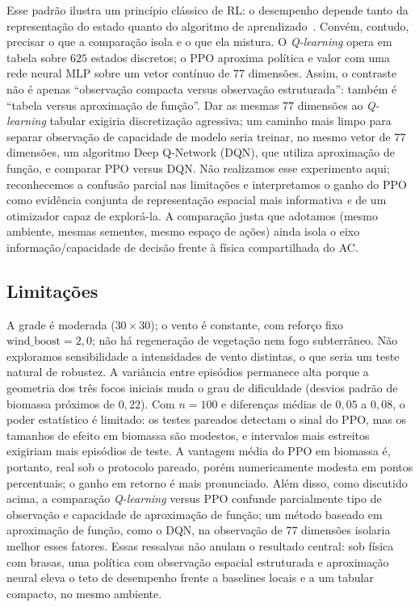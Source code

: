 \documentclass[11pt,a4paper]{article}
\begin{document}
Esse padrão ilustra um princípio clássico de RL: o desempenho depende tanto
da representação do estado quanto do algoritmo de
aprendizado~\cite{sutton2018}.
Convém, contudo, precisar o que a comparação isola e o que ela mistura.
O \emph{Q-learning} opera em tabela sobre $625$ estados discretos; o PPO
aproxima política e valor com uma rede neural MLP sobre um vetor contínuo de
$77$ dimensões.
Assim, o contraste não é apenas ``observação compacta versus observação
estruturada'': também é ``tabela versus aproximação de função''.
Dar as mesmas $77$ dimensões ao \emph{Q-learning} tabular exigiria
discretização agressiva; um caminho mais limpo para separar observação de
capacidade de modelo seria treinar, no mesmo vetor de $77$ dimensões, um
algoritmo Deep Q-Network (DQN), que utiliza aproximação de função, e comparar
PPO versus DQN.
Não realizamos esse experimento aqui; reconhecemos a confusão parcial nas
limitações e interpretamos o ganho do PPO como evidência conjunta de
representação espacial mais informativa \emph{e} de um otimizador capaz de
explorá-la.
A comparação justa que adotamos (mesmo ambiente, mesmas sementes, mesmo
espaço de ações) ainda isola o eixo informação/capacidade de decisão frente
à física compartilhada do AC.

\subsection{Limitações}
\label{sec:limitacoes}

A grade é moderada ($30\times 30$); o vento é constante, com reforço fixo
$\mathrm{wind\_boost}=2{,}0$; não há regeneração de vegetação nem fogo
subterrâneo.
Não exploramos sensibilidade a intensidades de vento distintas, o que seria
um teste natural de robustez.
A variância entre episódios permanece alta porque a geometria dos três focos
iniciais muda o grau de dificuldade (desvios padrão de biomassa próximos de
$0{,}22$).
Com $n=100$ e diferenças médias de $0{,}05$ a $0{,}08$, o poder estatístico é
limitado: os testes pareados detectam o sinal do PPO, mas os tamanhos de
efeito em biomassa são modestos, e intervalos mais estreitos exigiriam mais
episódios de teste.
A vantagem média do PPO em biomassa é, portanto, real sob o protocolo
pareado, porém numericamente modesta em pontos percentuais; o ganho em
retorno é mais pronunciado.
Além disso, como discutido acima, a comparação \emph{Q-learning} versus PPO
confunde parcialmente tipo de observação e capacidade de aproximação de
função; um método baseado em aproximação de função, como o DQN, na observação
de $77$ dimensões isolaria melhor esses fatores.
Essas ressalvas não anulam o resultado central: sob física com brasas, uma
política com observação espacial estruturada e aproximação neural eleva o
teto de desempenho frente a baselines locais e a um tabular compacto, no
mesmo ambiente.
\end{document}
